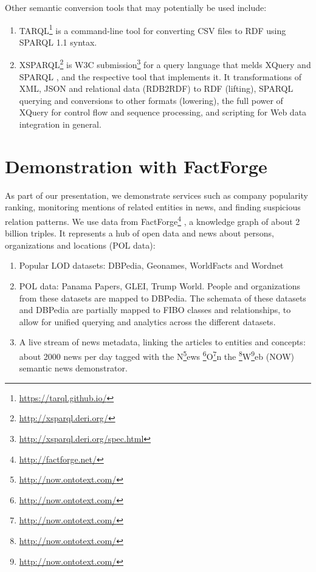 \documentclass[runningheads,a4paper]{llncs}
\begin{document}
Other semantic conversion tools that may potentially be used include:
\begin{enumerate}
\item TARQL\footnote{\url{https://tarql.github.io/}} is a command-line tool for converting CSV files to RDF using SPARQL 1.1 syntax.
\item XSPARQL\footnote{\url{http://xsparql.deri.org/}} \cite{__RefNumPara__8272_1562275339} is W3C submission\footnote{\url{http://xsparql.deri.org/spec.html}} for a query language that melds XQuery  \cite{__RefNumPara__7336_1562275339} and SPARQL  \cite{__RefNumPara__859_1597909725}, and the respective tool that implements it. It transformations of XML, JSON and relational data (RDB2RDF) to RDF (lifting), SPARQL querying and conversions to other formats (lowering), the full power of XQuery for control flow and sequence processing, and scripting for Web data integration in general.
\end{enumerate}

\section{Demonstration with FactForge}

As part of our presentation, we demonstrate services such as company popularity ranking, monitoring mentions of related entities in news, and finding suspicious relation patterns. We use data from FactForge\footnote{\url{http://factforge.net/}} \cite{__RefNumPara__3722_1458423281}, a knowledge graph of about 2 billion triples. It represents a hub of open data and news about persons, organizations and locations (POL data):
\begin{enumerate}
\item Popular LOD datasets: DBPedia, Geonames, WorldFacts and Wordnet
\item POL data: Panama Papers, GLEI, Trump World. People and organizations from these datasets are mapped to DBPedia. The schemata of these datasets and DBPedia are partially mapped to FIBO classes and relationships, to allow for unified querying and analytics across the different datasets. 
\item A live stream of news metadata, linking the articles to entities and concepts: about 2000 news per day tagged with the N\footnote{\url{http://now.ontotext.com/}}ews \footnote{\url{http://now.ontotext.com/}}O\footnote{\url{http://now.ontotext.com/}}n the \footnote{\url{http://now.ontotext.com/}}W\footnote{\url{http://now.ontotext.com/}}eb (NOW) semantic news demonstrator.
\end{enumerate}
\end{document}
